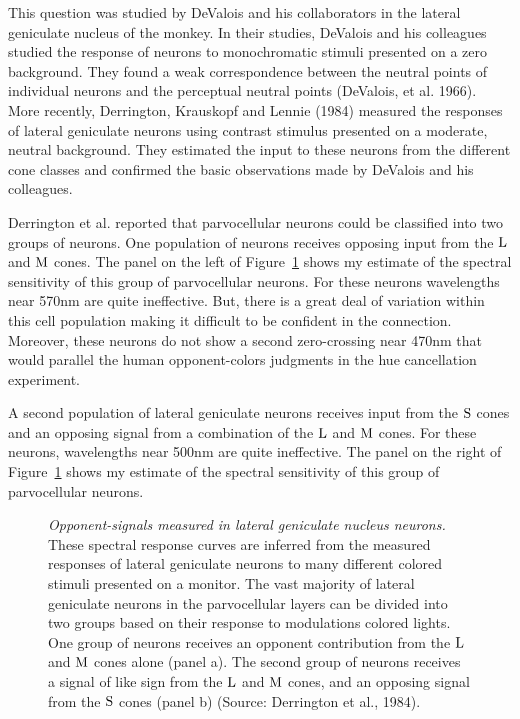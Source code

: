 This question was studied by DeValois and his collaborators in the
lateral geniculate nucleus of the monkey.  In their studies, DeValois
and his colleagues studied the response of neurons to monochromatic
stimuli presented on a zero background.  They found a weak
correspondence between the neutral points of individual neurons and
the perceptual neutral points (DeValois, et al.  1966).  More recently,
Derrington, Krauskopf and Lennie (1984) measured the responses of
lateral geniculate neurons using contrast stimulus presented on a
moderate, neutral background.  They estimated the input to these
neurons from the different cone classes and confirmed the basic
observations made by DeValois and his colleagues.

Derrington et al. reported that parvocellular neurons could be
classified into two groups of neurons.  One population of neurons
receives opposing input from the $\mbox{L}$ and $\mbox{M}$ cones.  The panel
on the left of Figure~\ref{f8:dkl} shows my estimate of the spectral
sensitivity of this group of parvocellular neurons.  For these neurons
wavelengths near 570nm are quite ineffective.  But, there is a great
deal of variation within this cell population making it difficult
to be confident in the connection.  Moreover, these neurons do not
show a second zero-crossing near 470nm that would parallel the human
opponent-colors judgments in the hue cancellation experiment.

A second population of lateral geniculate neurons receives input from
the $\mbox{S}$ cones and an opposing signal from a combination of the
$\mbox{L}$ and $\mbox{M}$ cones.  For these neurons, wavelengths near 500nm
are quite ineffective.  The panel on the right of Figure~\ref{f8:dkl}
shows my estimate of the spectral sensitivity of this group of
parvocellular neurons.
\begin{figure}
\centerline{
}
\caption[Derrington,Krauskopf and Lennie]{ {\em Opponent-signals
measured in lateral geniculate nucleus neurons.} These spectral
response curves are inferred from the measured responses of lateral
geniculate neurons to many different colored stimuli presented on a
monitor.  The vast majority of lateral geniculate neurons in the
parvocellular layers can be divided into two groups based on their
response to modulations colored lights.  One group of neurons
receives an opponent contribution from the $\mbox{L}$ and $\mbox{M}$ cones
alone (panel a).  The second group of neurons receives a signal of
like sign from the $\mbox{L}$ and $\mbox{M}$ cones, and an opposing signal
from the $\mbox{S}$ cones (panel b) (Source: Derrington et al., 1984).
} \label{f8:dkl} 
\end{figure}

